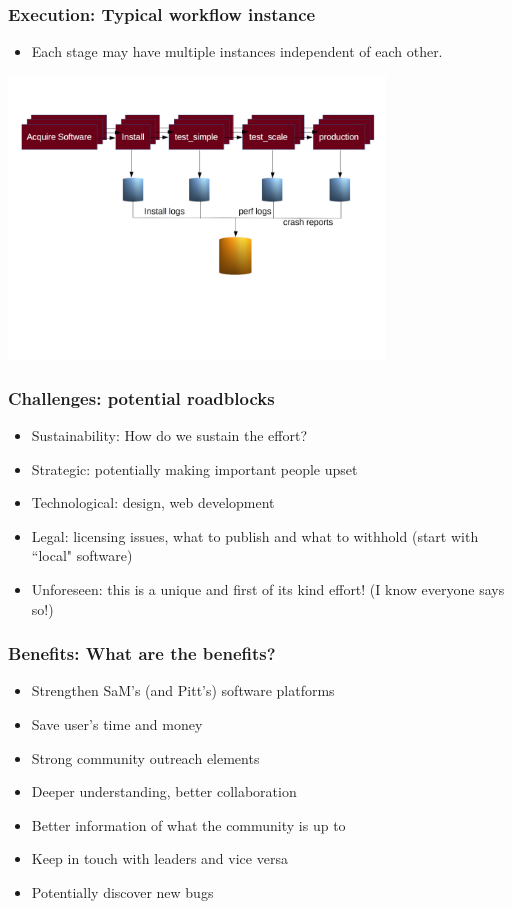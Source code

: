 \documentclass[hyperref={pdfpagelabels=false},12pt]{beamer}
\begin{document}
\begin{frame}
\frametitle{Execution: Typical workflow instance}
\begin{itemize}
\item
Each stage may have multiple instances independent of each other.
\end{itemize}
\vspace{1em}
\includegraphics[width=10cm]{workflow}
\end{frame}

\begin{frame}
\frametitle{Challenges: potential roadblocks}
\begin{itemize}
\itemsep1em
\item
 Sustainability: How do we sustain the effort?
\item 
Strategic: potentially making important people upset
\item
Technological: design, web development
\item
Legal: licensing issues, what to publish and what to withhold (start with ``local" software)
\item
Unforeseen: this is a unique and first of its kind effort! (I know everyone says so!)
\end{itemize}
\end{frame}

\begin{frame}
\frametitle{Benefits: What are the benefits?}
\begin{itemize}
\itemsep1em
\item Strengthen SaM's (and Pitt's) software platforms
\item
Save user's time and money
\item
Strong community outreach elements
\item
Deeper understanding, better collaboration
\item 
Better information of what the community is up to
\item
Keep in touch with leaders and vice versa
\item
Potentially discover new bugs
\end{itemize}
\end{frame}
\end{document}
